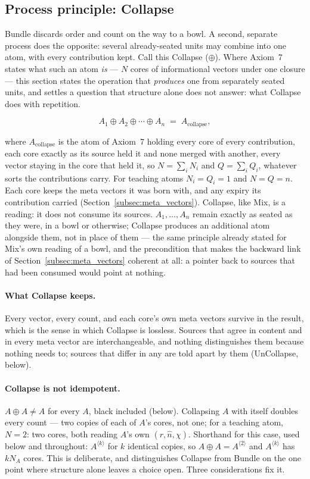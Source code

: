 \documentclass[12pt, a4paper]{article}
\begin{document}
\subsection{Process principle: Collapse}
\label{subsec:process_principle_collapse}

Bundle discards order and count on the way to a bowl. A second,
separate process does the opposite: several already-seated units may
combine into one atom, with every contribution kept. Call this
Collapse ($\oplus$). Where Axiom~7 states what such an atom \emph{is}
--- $N$ cores of informational vectors under one closure --- this section
states the operation that \emph{produces} one from separately seated
units, and settles a question that structure alone does not answer:
what Collapse does with repetition.

\[
A_1 \oplus A_2 \oplus \cdots \oplus A_n \;=\; A_{\text{collapse}},
\]

where $A_{\text{collapse}}$ is the atom of Axiom~7 holding every core
of every contribution, each core exactly as its source held it and none merged with another, every vector staying in the core that held it, so $N=\sum_iN_i$ and $Q=\sum_iQ_i$, whatever sorts the contributions carry. For teaching atoms $N_i=Q_i=1$ and
$N=Q=n$. Each core keeps the meta vectors it was born with, and any expiry its
contribution carried (Section~\ref{subsec:meta_vectors}). Collapse, like
Mix, is a reading:
it does not consume
its sources. $A_1,\ldots,A_n$ remain exactly as seated as they were,
in a bowl or otherwise; Collapse produces an additional atom
alongside them, not in place of them --- the same principle already
stated for Mix's own reading of a bowl, and the precondition that makes the backward link of Section~\ref{subsec:meta_vectors} coherent at all: a pointer back to sources that had been consumed would point at nothing.

\paragraph{What Collapse keeps.} Every vector, every count, and each core's own meta vectors survive in the result, which is the sense in which Collapse is lossless. Sources that agree in content and in every meta vector are interchangeable, and nothing distinguishes them because nothing needs to; sources that differ in any are told apart by them (UnCollapse, below).

\paragraph{Collapse is not idempotent.} $A\oplus A \ne A$ for every
$A$, black included (below). Collapsing $A$ with itself doubles every
count --- two copies of each of $A$'s cores, not one; for a teaching
atom, $N=2$: two cores, both reading $A$'s own $(r,\hat n,\chi)$.
Shorthand for this case, used below and throughout: $A^{\langle
k\rangle}$ for $k$ identical copies, so $A\oplus A =
A^{\langle 2\rangle}$ and $A^{\langle k\rangle}$ has $kN_A$ cores.
This is deliberate, and
distinguishes Collapse from Bundle on the one point where structure
alone leaves a choice open. Three considerations fix it.
\end{document}
